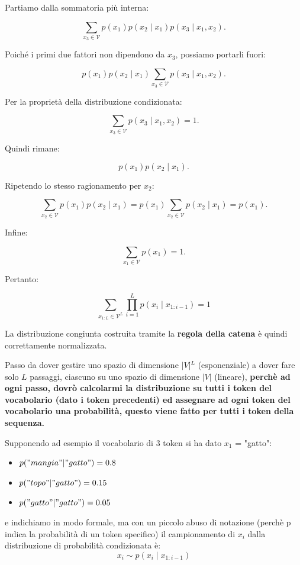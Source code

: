 Partiamo dalla sommatoria più interna:

$$
\sum_{x_3\in\mathcal V}
p(x_1)p(x_2\mid x_1)p(x_3\mid x_1,x_2).
$$

Poiché i primi due fattori non dipendono da $x_3$, possiamo portarli fuori:

$$
p(x_1)p(x_2\mid x_1)
\sum_{x_3\in\mathcal V}
p(x_3\mid x_1,x_2).
$$

Per la proprietà della distribuzione condizionata:

$$
\sum_{x_3\in\mathcal V}
p(x_3\mid x_1,x_2)=1.
$$

Quindi rimane:

$$
p(x_1)p(x_2\mid x_1).
$$

Ripetendo lo stesso ragionamento per $x_2$:

$$
\sum_{x_2\in\mathcal V}
p(x_1)p(x_2\mid x_1)
=
p(x_1)
\sum_{x_2\in\mathcal V}p(x_2\mid x_1)
=
p(x_1).
$$

Infine:

$$
\sum_{x_1\in\mathcal V}p(x_1)=1.
$$

Pertanto:

$$
\boxed{
\sum_{x_{1:L}\in\mathcal V^L}
\prod_{i=1}^{L}p(x_i\mid x_{1:i-1})
=1
}
$$

La distribuzione congiunta costruita tramite la \textbf{regola della catena} è quindi correttamente normalizzata.


Passo da dover gestire uno spazio di dimensione $\vert{}V\vert{}^L$ (esponenziale) a dover fare solo $L$ passaggi, ciascuno su uno spazio di dimensione $\vert{}V\vert{}$ (lineare),
\textbf{perchè ad ogni passo, dovrò calcolarmi la distribuzione su tutti i token del vocabolario (dato i token precedenti) ed assegnare ad ogni token del vocabolario una probabilità, questo viene fatto per tutti i token della sequenza.}

Supponendo ad esempio il vocabolario di 3 token si ha dato $x_1$ = "gatto":
\begin{itemize}
    \item $p("mangia" | "gatto") = 0.8$
    \item $p("topo" | "gatto") = 0.15$
    \item $p("gatto" | "gatto") = 0.05$
\end{itemize}

e indichiamo in modo formale, ma con un piccolo abuso di notazione (perchè p indica la probabilità di un token specifico) il campionamento di $x_i$ dalla distribuzione di probabilità condizionata è:
\begin{equation}
    x_i \sim p(x_i \mid x_{1:i-1})
\end{equation}

